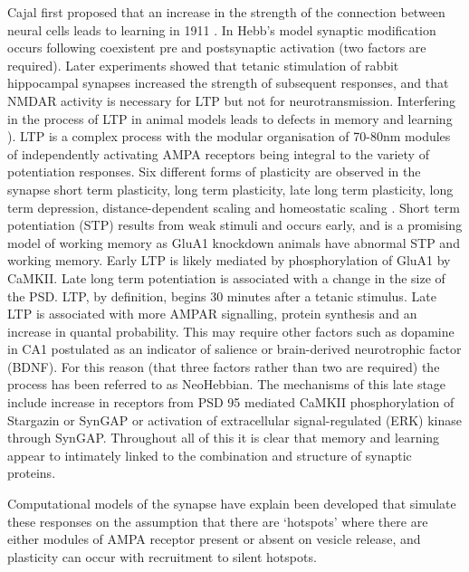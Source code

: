 Cajal first proposed that an increase in the strength of the connection between neural cells leads to learning in 1911 \cite{nicoll2017brief}. In Hebb's model synaptic modification occurs following coexistent pre and postsynaptic activation (two factors are required)\cite{hebb1949organization_check}. Later experiments showed that tetanic stimulation of rabbit hippocampal synapses increased the strength of subsequent responses\cite{bliss1973long}, and that NMDAR activity is necessary for LTP\cite{collingridge1983excitatory} but not for neurotransmission. 
 Interfering in the process of LTP in animal models leads to defects in memory and learning \cite{lisman2012mechanisms}).
LTP is a complex process with the modular organisation of 70-80nm modules of independently activating AMPA receptors being integral to the variety of potentiation responses\cite{lisman2017glutamatergic}. Six different forms of plasticity are observed in the synapse short term plasticity, long term plasticity, late long term plasticity, long term depression, distance-dependent scaling and homeostatic scaling \cite{lisman2017glutamatergic}. Short term potentiation (STP) results from weak stimuli and occurs early, and is a promising model of working memory as GluA1 knockdown animals have abnormal STP and working memory\cite{lisman2017glutamatergic}. Early LTP is likely mediated by phosphorylation of GluA1 by CaMKII. Late long term potentiation is associated with a change in the size of the PSD. LTP, by definition, begins 30 minutes after a tetanic stimulus. Late LTP is associated with more AMPAR signalling, protein synthesis\cite{park2018ampa} and an increase in quantal probability. This may require other factors such as dopamine in CA1 postulated as an indicator of salience or brain-derived neurotrophic factor (BDNF). For this reason (that three factors rather than two are required) the process has been referred to as NeoHebbian\cite{lisman2017glutamatergic}. The mechanisms of this late stage include increase in receptors from PSD 95 mediated CaMKII phosphorylation of Stargazin or SynGAP or activation of extracellular signal-regulated (ERK) kinase through SynGAP. Throughout all of this it is clear that memory and learning appear to intimately linked to  the combination and structure of synaptic proteins. 

 
 
Computational models of the synapse have explain been developed that simulate these responses on the assumption that there are `hotspots' where there are either modules of AMPA receptor present or absent on vesicle release, and plasticity can occur with recruitment to silent hotspots\cite{lisman2017glutamatergic}.
 

